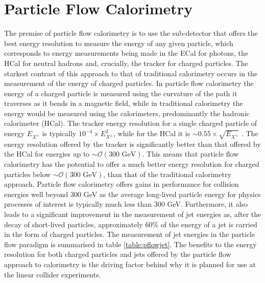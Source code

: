 \section{Particle Flow Calorimetry}
The premise of particle flow calorimetry is to use the sub-detector that offers the best energy resolution to measure the energy of any given particle, which corresponds to energy measurements being made in the ECal for photons, the HCal for neutral hadrons and, crucially, the tracker for charged particles.  The starkest contrast of this approach to that of traditional calorimetry occurs in the measurement of the energy of charged particles.  In particle flow calorimetry the energy of a charged particle is measured using the curvature of the path it traverses as it bends in a magnetic field, while in traditional calorimetry the energy would be measured using the calorimeters, predominantly the hadronic calorimeter (HCal).  The tracker energy resolution for a single charged particle of energy $E_{X^{\pm}}$ is typically $10^{-4} \times E_{X^{\pm}}^{2}$, while for the HCal it is $\sim 0.55 \times \sqrt{E_{X^{\pm}}}$ \cite{arXiv:0907.3577}.  The energy resolution offered by the tracker is significantly better than that offered by the HCal for energies up to $\sim \mathcal{O}(300 \text{ GeV})$.  This means that particle flow calorimetry has the potential to offer a much better energy resolution for charged particles below $\sim \mathcal{O}(300 \text{ GeV})$, than that of the traditional calorimetry approach.  Particle flow calorimetry offers gains in performance for collision energies well beyond 300 GeV as the average long-lived particle energy for physics processes of interest is typically much less than 300 GeV.  Furthermore, it also leads to a significant improvement in the measurement of jet energies as, after the decay of short-lived particles, approximately 60\% of the energy of a jet is carried in the form of charged particles.  The measurement of jet energies in the particle flow paradigm is summarised in table \ref{table:pflowjet}.  The benefits to the energy resolution for both charged particles and jets offered by the particle flow approach to calorimetry is the driving factor behind why it is planned for use at the linear collider experiments.  

